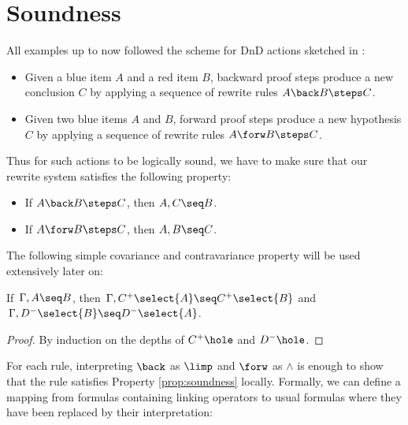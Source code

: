 \section{Soundness}


All examples up to now followed the scheme for DnD actions sketched in
:
\begin{itemize}
  \item Given a blue item $A$ and a red item $B$, backward proof steps produce a
  new conclusion $C$ by applying a sequence of rewrite rules $A \back B \steps
  C$.
  \item Given two blue items $A$ and $B$, forward proof steps produce a new
  hypothesis $C$ by applying a sequence of rewrite rules $A \forw B \steps C$.
\end{itemize}

Thus for such actions to be logically sound, we have to make sure that our
rewrite system satisfies the following property:

\begin{theorem}[Soundness]\label{prop:soundness}
  \phantom{a}
  \begin{itemize}
    \item If $A \back B \steps C$, then $A, C \seq B$.
    \item If $A \forw B \steps C$, then $A, B \seq C$.
  \end{itemize}
\end{theorem}

The following simple covariance and contravariance property will be used
extensively later on:
\begin{lemma}[Variance]\label{prop:cov}
  If $\, \Gamma, A\seq B$, then $\, \Gamma, C^+\select{A}\seq C^+\select{B}$
  and $\, \Gamma, D^-\select{B}\seq D^-\select{A}$.
\end{lemma}
\begin{proof}
  By induction on the depths of $C^+\hole$ and $D^-\hole$.
\end{proof}

For each rule, interpreting $\back$ as $\limp$ and $\forw$ as $\land$ is enough
to show that the rule satisfies Property \ref{prop:soundness} locally. Formally,
we can define a mapping from formulas containing linking operators to usual
formulas where they have been replaced by their interpretation:

